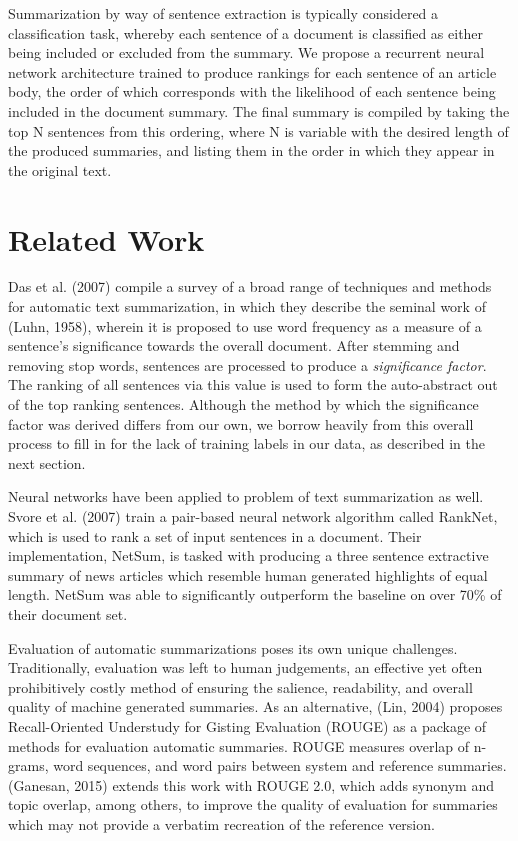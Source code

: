 \documentclass[11pt]{article}
\begin{document}
	Summarization by way of sentence extraction is typically considered a classification task, whereby each sentence of a document is classified as either being included or excluded from the summary. We propose a recurrent neural network architecture trained to produce rankings for each sentence of an article body, the order of which corresponds with the likelihood of each sentence being included in the document summary. The final summary is compiled by taking the top N sentences from this ordering, where N is variable with the desired length of the produced summaries, and listing them in the order in which they appear in the original text.
	
\section{Related Work}

	Das et al. (2007) compile a survey of a broad range of techniques and methods for automatic text summarization, in which they describe the seminal work of (Luhn, 1958), wherein it is proposed to use word frequency as a measure of a sentence's significance towards the overall document. After stemming and removing stop words, sentences are processed to produce a \emph{significance factor}. The ranking of all sentences via this value is used to form the auto-abstract out of the top ranking sentences. Although the method by which the significance factor was derived differs from our own, we borrow heavily from this overall process to fill in for the lack of training labels in our data, as described in the next section. %

	Neural networks have been applied to problem of text summarization as well. Svore et al. (2007) train a pair-based neural network algorithm called RankNet, which is used to rank a set of input sentences in a document. Their implementation, NetSum, is tasked with producing a three sentence extractive summary of news articles which resemble human generated highlights of equal length. NetSum was able to significantly outperform the baseline on over 70\% of their document set. %

	Evaluation of automatic summarizations poses its own unique challenges. Traditionally, evaluation was left to human judgements, an effective yet often prohibitively costly method of ensuring the salience, readability, and overall quality of machine generated summaries. As an alternative, (Lin, 2004) proposes Recall-Oriented Understudy for Gisting Evaluation (ROUGE) as a package of methods for evaluation automatic summaries. ROUGE measures overlap of n-grams, word sequences, and word pairs between system and reference summaries. (Ganesan, 2015) extends this work with ROUGE 2.0, which adds synonym and topic overlap, among others, to improve the quality of evaluation for summaries which may not provide a verbatim recreation of the reference version.  %
\end{document}
